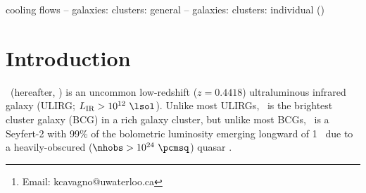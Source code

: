 \documentclass[useAMS,usenatbib]{mn2e}
\title[\mystitle]{\mytitle}
\author[Cavagnolo et al.]{K. Cavagnolo$^{1}$\thanks{Email:
    kcavagno@uwaterloo.ca}, M. Donahue$^{2}$, B. McNamara$^{1,3,4}$,
  G. M. Voit$^{2}$, and M. Sun$^{5}$\\
$^{1}$Department of Physics and Astronomy, University of Waterloo,
Waterloo, ON N2L 3G1, Canada.\\
$^{2}$Department of Physics and Astronomy, Michigan State University,
East Lansing, MI, 48824-2320, USA.\\
$^{3}$Perimeter Institute for Theoretical Physics, 31 Caroline St. N.,
Waterloo, Ontario, N2L 2Y5, Canada\\
$^{4}$Harvard-Smithsonian Center for Astrophysics, 60 Garden Street,
Cambridge, MA 02138, USA\\
$^{5}$Department of Astronomy, University of Virginia,
Charlottesville, VA, 22904, USA.}
\begin{document}
\date{Accepted 2010 Month DD. Received 2010 Month DD; in original form 2010 Month DD}

\pagerange{\pageref{firstpage}--\pageref{lastpage}} 

\maketitle

\label{firstpage}


\begin{abstract}
  We present a detailed study of the hyperluminous infrared brightest
  cluster galaxy \iras\ using a deep \chandra\ X-ray observation. The
  X-ray observations reveal interaction between the galaxy's halo and
  the mechanical outflow \& radiative emission of the central AGN. We
  show that the properties of the \iras\ nucleus are consistent with
  reflected emission from an AGN embedded in a moderately
  Compton-thick medium. The observations indicate that \iras\ may be
  in transition from a radiatively-dominated to a
  mechanically-dominated mode of AGN feedback. We highlight why
  \iras\ is an ideal test case of a very short-lived but highly active
  stage of galaxy cluster and central galaxy formation.
\end{abstract}


\begin{keywords}
cooling flows -- galaxies: clusters: general -- galaxies: clusters:
individual (\iras)
\end{keywords}

\section{Introduction}
\label{sec:intro}

\iras\ (hereafter, \irs) is an uncommon low-redshift ($z = 0.4418$)
ultraluminous infrared galaxy (ULIRG; $L_{\mathrm{IR}} > 10^{12}
~\lsol$). Unlike most ULIRGs, \irs\ is the brightest cluster galaxy
(BCG) in a rich galaxy cluster, but unlike most BCGs, \irs\ is a
Seyfert-2 with 99\% of the bolometric luminosity emerging longward of
1 \mymicron\ due to a heavily-obscured ($\nhobs > 10^{24} ~\pcmsq$)
quasar \citep{1988ApJ...328..161K, 1993ApJ...415...82H,
  1994ApJ...436L..51F, 1998ApJ...506..205E, 2000A&A...353..910F,
  2001MNRAS.321L..15I}.
\end{document}

